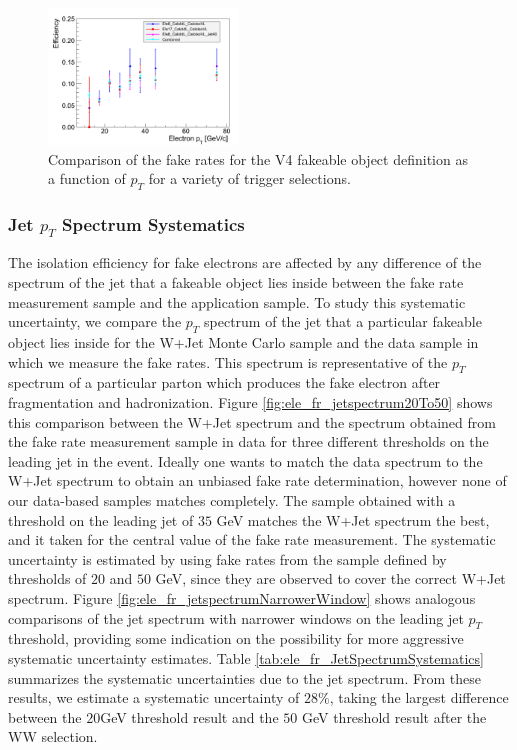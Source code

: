 \begin{figure}[!htbp]
\begin{center}
\includegraphics[width=0.45\textwidth]{figures/ElectronFakeRate_DenominatorV4_TriggerDependence.pdf}
\caption{Comparison of the fake rates for the V4 fakeable object definition as a function of $p_T$
for a variety of trigger selections.}
\label{fig:ele_fr_triggerDependence}
\end{center}
\end{figure}


\subsubsection{Jet $p_{T}$ Spectrum Systematics}
\label{sec:FakeElectronBkgJetSpectrumSystematics}

The isolation efficiency for fake electrons are affected by any difference of the spectrum of the
jet that a fakeable object lies inside between the fake rate measurement sample and the 
application sample. To study this systematic uncertainty, we compare the $p_{T}$ spectrum 
of the jet that a particular fakeable object lies inside for the W+Jet Monte Carlo sample and the
data sample in which we measure the fake rates. This spectrum is representative of the $p_{T}$
spectrum of a particular parton which produces the fake electron after fragmentation and 
hadronization. Figure \ref{fig:ele_fr_jetspectrum20To50} shows this comparison between the W+Jet spectrum and the
spectrum obtained from the fake rate measurement sample in data for three different 
thresholds on the leading jet in the event. Ideally one wants to match the data spectrum to the
W+Jet spectrum to obtain an unbiased fake rate determination, however none of our data-based
samples matches completely. The sample obtained with a threshold on the leading jet of
$35$ GeV matches the W+Jet spectrum the best, and it taken for the central value of the 
fake rate measurement. The systematic uncertainty is estimated by using fake rates from the sample 
defined by thresholds of $20$ and $50$ GeV, since they are observed to cover the 
correct W+Jet spectrum. Figure \ref{fig:ele_fr_jetspectrumNarrowerWindow} shows analogous 
comparisons of the jet spectrum with narrower windows on the leading jet $p_{T}$ threshold,
providing some indication on the possibility for more aggressive systematic uncertainty 
estimates. Table \ref{tab:ele_fr_JetSpectrumSystematics} summarizes the systematic
uncertainties due to the jet spectrum. From these results, we estimate a systematic uncertainty 
of $28\%$, taking the largest difference between the $20$GeV threshold result and the $50$ GeV 
threshold result after the WW selection.

